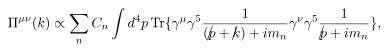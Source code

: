 \begin{equation}
\Pi^{\mu\nu}(k) \propto \sum_n C_n \int d^4p \, {\rm
Tr}\{\gamma^\mu\gamma^5 {1 \over
{({p\kern-0.15em\raise0.17ex\llap{/}\kern0.15em\relax} +
{k\kern-0.15em\raise0.17ex\llap{/}\kern0.15em\relax}) + i m_n }}
\gamma^\nu \gamma^5 {1 \over
{{p\kern-0.15em\raise0.17ex\llap{/}\kern0.15em\relax} + i m_n}}\},
\end{equation}

